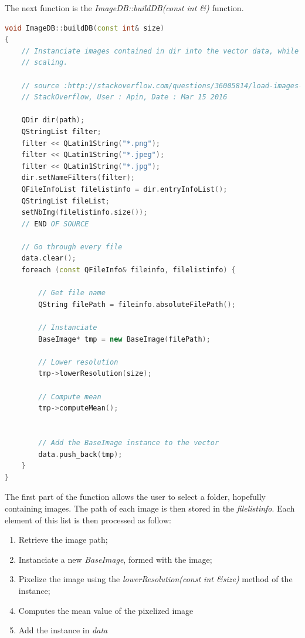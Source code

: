 \documentclass[aps,letterpaper,11pt]{revtex4}
\begin{document}
The next function is the \textit{ImageDB::buildDB(const int \&)} function.

\begin{lstlisting}[language=C++]
void ImageDB::buildDB(const int& size)
{
    // Instanciate images contained in dir into the vector data, while performing image
    // scaling.

    // source :http://stackoverflow.com/questions/36005814/load-images-from-folder-with-qt
    // StackOverflow, User : Apin, Date : Mar 15 2016

    QDir dir(path);
    QStringList filter;
    filter << QLatin1String("*.png");
    filter << QLatin1String("*.jpeg");
    filter << QLatin1String("*.jpg");
    dir.setNameFilters(filter);
    QFileInfoList filelistinfo = dir.entryInfoList();
    QStringList fileList;
    setNbImg(filelistinfo.size());
    // END OF SOURCE

    // Go through every file
    data.clear();
    foreach (const QFileInfo& fileinfo, filelistinfo) {

        // Get file name
        QString filePath = fileinfo.absoluteFilePath();

        // Instanciate
        BaseImage* tmp = new BaseImage(filePath);

        // Lower resolution
        tmp->lowerResolution(size);

        // Compute mean
        tmp->computeMean();


        // Add the BaseImage instance to the vector
        data.push_back(tmp);
    }
}
\end{lstlisting}

The first part of the function allows the user to select a folder, hopefully containing images. The path of each image is then stored in the \textit{filelistinfo}. Each element of this list is then processed as follow:

\begin{enumerate}
  \item Retrieve the image path;
  \item Instanciate a new \textit{BaseImage}, formed with the image;
  \item Pixelize the image using the \textit{lowerResolution(const int \&size)} method of the instance;
  \item Computes the mean value of the pixelized image
  \item Add the instance in \textit{data}
\end{enumerate}
\end{document}
